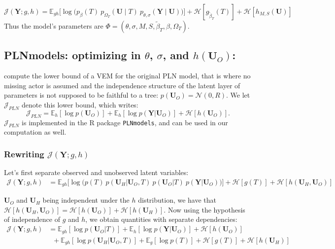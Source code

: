 \documentclass[11pt,a4paper]{article}
\newcommand{\entr}{\mathcal{H}}
\newcommand{\Ybf}{\boldsymbol{Y}}
\newcommand{\Ubf}{\boldsymbol{U}}
\newcommand{\Esp}{\mathds{E}}
\begin{document}
\begin{equation}
\label{firstJ}
 \boxed{\mathcal{J}(\Ybf; g,h) = \Esp_{gh} \Big[\log \big(p_\beta(T)\:p_{\Omega_T}(\Ubf\mid T)\:p_{\theta, \sigma}(\Ybf\mid \Ubf)\big)\Big] + \entr[g_{\widetilde{\beta}_T}(T)] + \entr[h_{M,S}(\Ubf)]}
\end{equation}
Thus the model's parameters are $\Phi = (\theta,\sigma,M,S,\widetilde{\beta}_T, \beta,  \Omega_T)$.

\subsection{PLNmodels: optimizing in $\theta$, $\sigma$, and $h(\Ubf_O)$:}
\citet{CMR18} compute the lower bound of a VEM for the original PLN model, that is where no missing actor is assumed and the independence structure of the latent layer of parameters is not supposed to be faithful to a tree: $p(\Ubf_O) = \mathcal{N}(0,R)$. We let $\mathcal{J}_{PLN}$ denote this lower bound, which writes:
$$\mathcal{J}_{PLN} = \Esp_h[\log p(\Ubf_O)] + \Esp_h[\log p(\Ybf|\Ubf_O)] + \entr[h(\Ubf_O)].$$ $\mathcal{J}_{PLN}$ is implemented  in the R package \texttt{PLNmodels}, and can be used in our computation as well.

\subsubsection{Rewriting  $\mathcal{J}(\Ybf; g,h)$}
Let's first separate observed and unobserved latent variables:
\begin{align*}
\mathcal{J}(\Ybf; g,h)&= \Esp_{gh}\Big[\log \big(p(T)\:  p(\Ubf_H| \Ubf_O,T)\: p(\Ubf_O|T)\:p(\Ybf|\Ubf_O)\big)\Big] + \entr[g(T)] +\entr[h(\Ubf_H,\Ubf_O)]
\end{align*}

 $\Ubf_O$ and $\Ubf_H$ being independent under the $h$ distribution, we have that $\entr[h(\Ubf_H,\Ubf_O)] =\entr[h(\Ubf_O)] +\entr[h(\Ubf_H)]$. Now using the hypothesis of independence of $g$ and $h$, we obtain quantities with separate dependencies:
\begin{align}
\mathcal{J}(\Ybf; g,h)&=  \Esp_{gh}[\log p(\Ubf_O | T)] +\Esp_h[\log p(\Ybf|\Ubf_O)]+\entr[h(\Ubf_O)]  \label{PLNlike}\\
& \;\; + \Esp_{gh}[\log p(\Ubf_H | \Ubf_O,T) ]+\Esp_g[\log p(T)] +\entr[g(T)]+\entr[h(\Ubf_H)] \label{new}
\end{align}
\end{document}
